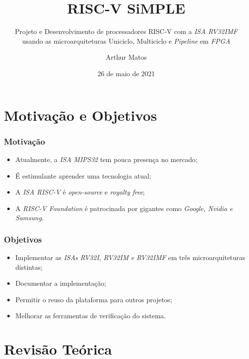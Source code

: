 \documentclass[aspectratio=169]{beamer}
\title{RISC-V SiMPLE}
\subtitle{Projeto e Desenvolvimento de processadores RISC-V com a \textit{ISA RV32IMF} usando as microarquiteturas Uniciclo, Multiciclo e \textit{Pipeline} em \textit{FPGA}}
\author{Arthur Matos}
\institute{Universidade de Brasília - UnB --- Faculdade de Tecnologia - FT}
\date{26 de maio de 2021}
\begin{document}
\begin{frame}
\titlepage
\end{frame}


\section{Motivação e Objetivos}
    \begin{frame}
        \frametitle{Motivação}
        \vfill
        \begin{itemize}
            \item Atualmente, a \textit{ISA MIPS32} tem pouca presença no mercado;
            \item É estimulante aprender uma tecnologia atual;
            \item A \textit{ISA RISC-V} é \textit{open-source} e \textit{royalty free};
            \item A \textit{RISC-V Foundation} é patrocinada por gigantes como \textit{Google, Nvidia e Samsung}.
        \end{itemize}
        \vfill
    \end{frame}

    \begin{frame}
        \frametitle{Objetivos}
        \vfill
        \begin{itemize}
            \item Implementar as \textit{ISAs RV32I, RV32IM e RV32IMF} em três microarquiteturas distintas;
            \item Documentar a implementação;
            \item Permitir o reuso da plataforma para outros projetos;
            \item Melhorar as ferramentas de verificação do sistema.
        \end{itemize}
        \vfill
    \end{frame}

\section{Revisão Teórica}
\end{document}
